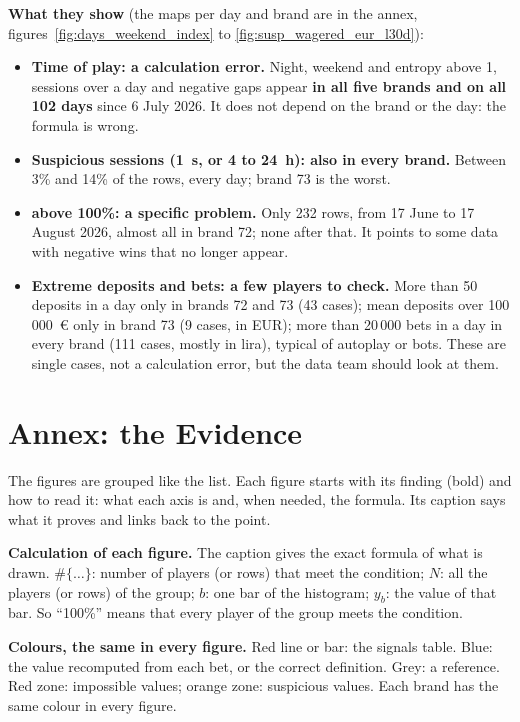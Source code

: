 \documentclass[11pt,a4paper]{article}
\DeclareRobustCommand{\code}[1]{\path{#1}}
\begin{document}
\textbf{What they show} (the maps per day and brand are in the annex, figures~\ref{fig:days_weekend_index} to \ref{fig:susp_wagered_eur_l30d}):
\begin{itemize}
  \item \textbf{Time of play: a calculation error.} Night, weekend and entropy above 1, sessions over a day and negative gaps appear \textbf{in all five brands and on all 102 days} since 6 July 2026. It does not depend on the brand or the day: the formula is wrong.
  \item \textbf{Suspicious sessions (1~s, or 4 to 24~h): also in every brand.} Between 3\% and 14\% of the rows, every day; brand 73 is the worst.
  \item \textbf{\code{hold_pct_l30d} above 100\%: a specific problem.} Only 232 rows, from 17 June to 17 August 2026, almost all in brand 72; none after that. It points to some data with negative wins that no longer appear.
  \item \textbf{Extreme deposits and bets: a few players to check.} More than 50 deposits in a day only in brands 72 and 73 (43 cases); mean deposits over 100\,000~€ only in brand 73 (9 cases, in EUR); more than 20\,000 bets in a day in every brand (111 cases, mostly in lira), typical of autoplay or bots. These are single cases, not a calculation error, but the data team should look at them.
\end{itemize}

\clearpage
\appendix
\section{Annex: the Evidence}\label{sec:figures}
The figures are grouped like the list. Each figure starts with its finding (bold) and how to read it: what each axis is and, when needed, the formula. Its caption says what it proves and links back to the point.

\textbf{Calculation of each figure.} The caption gives the exact formula of what is drawn. $\#\{\ldots\}$: number of players (or rows) that meet the condition; $N$: all the players (or rows) of the group; $b$: one bar of the histogram; $y_b$: the value of that bar. So ``100\%'' means that every player of the group meets the condition.

\textbf{Colours, the same in every figure.} Red line or bar: the signals table. Blue: the value recomputed from each bet, or the correct definition. Grey: a reference. Red zone: impossible values; orange zone: suspicious values. Each brand has the same colour in every figure.
\end{document}
